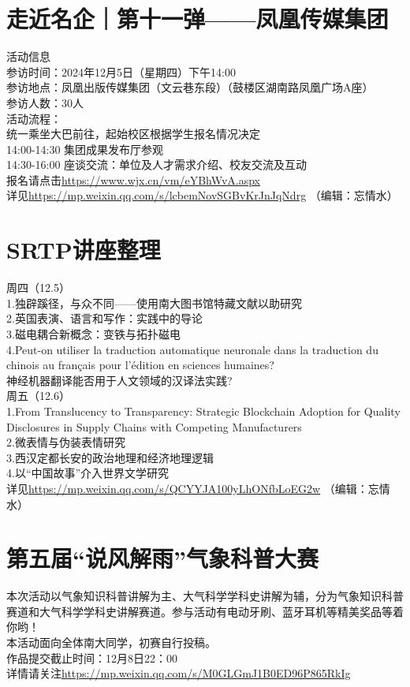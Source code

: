 \documentclass[letterpaper, 12pt]{article}
\begin{document}
\begin{multicols}{2}
\section{走近名企｜第十一弹——凤凰传媒集团}
活动信息\\
参访时间：2024年12月5日（星期四）下午14:00\\
参访地点：凤凰出版传媒集团（文云巷东段）（鼓楼区湖南路凤凰广场A座）\\
参访人数：30人\\
活动流程：\\
统一乘坐大巴前往，起始校区根据学生报名情况决定\\
14:00-14:30  集团成果发布厅参观\\
14:30-16:00  座谈交流：单位及人才需求介绍、校友交流及互动\\
报名请点击\url{https://www.wjx.cn/vm/eYBhWvA.aspx}\\
详见\url{https://mp.weixin.qq.com/s/lcbemNovSGBvKrJnJqNdrg}
（编辑：忘情水）

\section{SRTP讲座整理}
周四（12.5）\\
1.独辟蹊径，与众不同——使用南大图书馆特藏文献以助研究\\
2.英国表演、语言和写作：实践中的导论\\
3.磁电耦合新概念：变铁与拓扑磁电\\
4.Peut-on utiliser la traduction automatique neuronale dans la traduction du chinois au français pour l'édition en sciences humaines? \\
神经机器翻译能否用于人文领域的汉译法实践?\\
周五（12.6）\\
1.From Translucency to Transparency: Strategic Blockchain Adoption for Quality Disclosures in Supply Chains with Competing Manufacturers\\
2.微表情与伪装表情研究\\
3.西汉定都长安的政治地理和经济地理逻辑\\
4.以“中国故事”介入世界文学研究\\
详见\url{https://mp.weixin.qq.com/s/QCYYJA100yLhONfbLoEG2w}
（编辑：忘情水）

\section{第五届“说风解雨”气象科普大赛}
本次活动以气象知识科普讲解为主、大气科学学科史讲解为辅，分为气象知识科普赛道和大气科学学科史讲解赛道。参与活动有电动牙刷、蓝牙耳机等精美奖品等着你哟！\\
本活动面向全体南大同学，初赛自行投稿。\\
作品提交截止时间：12月8日22：00\\
详情请关注\url{https://mp.weixin.qq.com/s/M0GLGmJ1B0ED96P865RkIg}\\


\end{multicols}
\end{document}
